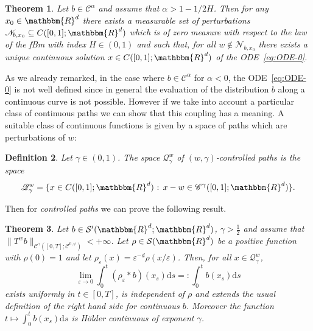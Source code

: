 \documentclass[a4paper,11pt]{article}
\newcommand{\mathd}{\mathrm{d}}
\newcommand{\tmtextit}[1]{{\itshape{#1}}}
\newtheorem{theorem}{Theorem}[section]
\newtheorem{definition}[theorem]{Definition}
\newcommand{\CC}{\mathscr C}
\newcommand{\CQ}{\mathscr Q}
\newcommand{\CN}{\mathscr N}
\begin{document}
\begin{theorem}
  \label{th:ode-better-0}Let $b \in \CC^{\alpha}$ and assume that $\alpha
  >1-1/2H$. Then for any $x_{0} \in \mathbbm{R}^{d}$ there exists a measurable
  set of perturbations $\CN_{b,x_{0}} \subseteq C ( [ 0,1 ]
  ;\mathbbm{R}^{d} )$ which is of zero measure with respect to the law of the
  fBm with index $H \in ( 0,1 )$ and such that, for all $w \notin
  \CN_{b,x_{0}}$ there exists a unique continuous solution $x \in C (
  [ 0,1 ] ;\mathbbm{R}^{d} )$ of the ODE~{\eqref{eq:ODE-0}}.
\end{theorem}

As we already remarked, in the case where $b \in \CC^{\alpha}$ for $\alpha
<0$, the ODE~{\eqref{eq:ODE-0}} is not well defined since in general the
evaluation of the distribution $b$ along a continuous curve is not possible.
However if we take into account a particular class of continuous paths we can
show that this coupling has a meaning. A suitable class of continuous
functions is given by a space of paths which are perturbations of $w$:

\begin{definition}
  Let $\gamma\in(0,1)$. The space $\CQ^{w}_{\gamma}$ of $(w, \gamma )$-controlled paths is
  the space
  \[ \CQ^{w}_{\gamma} = \{x \in C ( [ 0,1 ] ;\mathbbm{R}^{d} )  
     \text{  : } x-w \in \CC^{\gamma} ( [ 0,1 ] ;\mathbbm{R}^{d} ) \} . \]
\end{definition}

Then for \tmtextit{controlled paths} we can prove the following result.

\begin{theorem}
  \label{th:def-of-int-b}Let $b \in \mathcal{S}' ( \mathbbm{R}^{d}
  ;\mathbbm{R}^{d} )$, $\gamma>\frac12$  and assume that $\| T^{w} b \|_{\CC^{\gamma} \left( [
  0,T ] ; \CC^{0, \psi} \right)} <+ \infty$. Let $\rho \in \mathcal{S} (
  \mathbbm{R}^{d} )$ be a positive function with $\rho ( 0 ) =1$ and let
  $\rho_{\varepsilon} ( x ) = \varepsilon^{-d} \rho ( x/ \varepsilon )$. Then,
  for all $x \in \CQ^{w}_{\gamma}$,
  \begin{equation}
    \lim_{\varepsilon \rightarrow 0} \int_{0}^{t} ( \rho_{\varepsilon} \ast b
    ) ( x_{s} ) \mathd s=: \int_{0}^{t} b ( x_{s} ) \mathd s
    \label{eq:limiting-procedure}
  \end{equation}
  exists uniformly in $t \in [ 0,T ]$, is independent of $\rho$ and extends
  the usual definition of the right hand side for continuous $b$. Moreover the function $t
  \mapsto \int_{0}^{t} b ( x_{s} ) \mathd s$ is Hölder continuous of exponent
  $\gamma$. 
\end{theorem}
\end{document}
